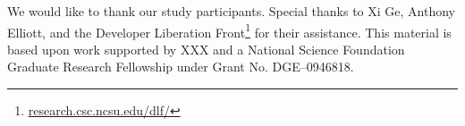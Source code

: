 \documentclass[conference]{IEEEtran}
\begin{document}
We would like to thank our study participants. 
Special thanks to Xi Ge, Anthony Elliott, and the Developer Liberation Front\footnote{\url{research.csc.ncsu.edu/dlf/}} for their assistance. 
This material is based upon work supported by XXX and a National Science Foundation Graduate Research Fellowship under Grant No. DGE--0946818.



%




\end{document}
